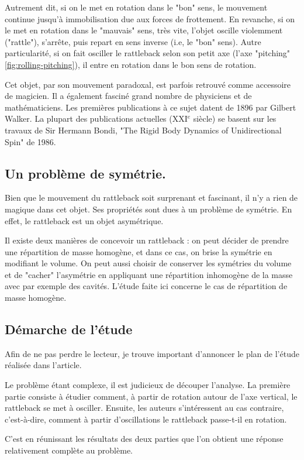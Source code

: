 \documentclass[12pt,a4paper]{article}
\begin{document}
	Autrement dit, si on le met en rotation dans le "bon" sens, le mouvement continue jusqu'à immobilisation due aux forces de frottement. En revanche, si on le met en rotation dans le "mauvais" sens, très vite, l'objet oscille violemment ("rattle"), s'arrête, puis repart en sens inverse (i.e, le "bon" sens). Autre particularité, si on fait osciller le rattleback selon son petit axe (l'axe "pitching" \autoref{fig:rolling-pitching}), il entre en rotation dans le bon sens de rotation.
	
	Cet objet, par son mouvement paradoxal, est parfois retrouvé comme accessoire de magicien.
	Il a également fasciné grand nombre de physiciens et de mathématiciens. Les premières publications à ce sujet datent de 1896 par Gilbert Walker. La plupart des publications actuelles (XXI$^{e}$ siècle) se basent sur les travaux de Sir Hermann Bondi, "The Rigid Body Dynamics of Unidirectional Spin" de 1986.
	\subsection{Un problème de symétrie.}
	Bien que le mouvement du rattleback soit surprenant et fascinant, il n'y a rien de magique dans cet objet. Ses propriétés sont dues à un problème de symétrie. En effet, le rattleback est un objet asymétrique.
	
	Il existe deux manières de concevoir un rattleback : on peut décider de prendre une répartition de masse homogène, et dans ce cas, on brise la symétrie en modifiant le volume. On peut aussi choisir de conserver les symétries du volume et de "cacher" l'asymétrie en appliquant une répartition inhomogène de la masse avec par exemple des cavités. L'étude faite ici concerne le cas de répartition de masse homogène.
	
	\subsection{Démarche de l'étude}
	Afin de ne pas perdre le lecteur, je trouve important d'annoncer le plan de l'étude réalisée dans l'article.
	
	Le problème étant complexe, il est judicieux de découper l'analyse.
	La première partie consiste à étudier comment, à partir de rotation autour de l'axe vertical, le rattleback se met à osciller.
	Ensuite, les auteurs s'intéressent au cas contraire, c'est-à-dire, comment à partir d'oscillations le rattleback passe-t-il en rotation.
	
	C'est en réunissant les résultats des deux parties que l'on obtient une réponse relativement complète au problème.
\end{document}

